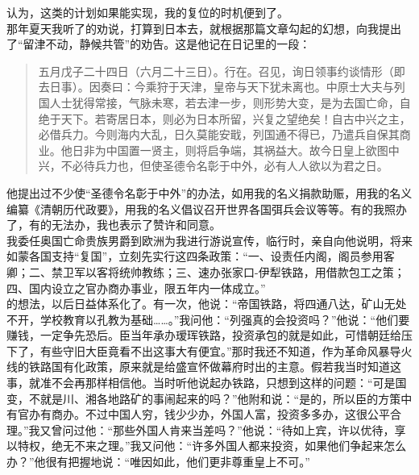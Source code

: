 认为，这类的计划如果能实现，我的复位的时机便到了。\\

那年夏天我听了的劝说，打算到日本去，就根据那篇文章勾起的幻想，向我提出了“留津不动，静候共管”的劝告。这是他记在日记里的一段：\\

\begin{quote}
	五月戊子二十四日（六月二十三日）。行在。召见，询日领事约谈情形（即去日事）。因奏曰：今乘狩于天津，皇帝与天下犹未离也。中原士大夫与列国人士犹得常接，气脉未寒，若去津一步，则形势大变，是为去国亡命，自绝于天下。若寄居日本，则必为日本所留，兴复之望绝矣！自古中兴之主，必借兵力。今则海内大乱，日久莫能安戢，列国通不得已，乃遣兵自保其商业。他日非为中国置一贤主，则将启争端，其祸益大。故今日皇上欲图中兴，不必待兵力也，但使圣德令名彰于中外，必有人人欲以为君之日。\\
\end{quote}

他提出过不少使“圣德令名彰于中外”的办法，如用我的名义捐款助赈，用我的名义编纂《清朝历代政要》，用我的名义倡议召开世界各国弭兵会议等等。有的我照办了，有的无法办，我也表示了赞许和同意。\\

我委任奥国亡命贵族男爵到欧洲为我进行游说宣传，临行时，亲自向他说明，将来如蒙各国支持“复国”，立刻先实行这四条政策：“一、设责任内阁，阁员参用客卿；二、禁卫军以客将统帅教练；三、速办张家口-伊犁铁路，用借款包工之策；四、国内设立之官办商办事业，限五年内一体成立。”\\

的想法，以后日益体系化了。有一次，他说：“帝国铁路，将四通八达，矿山无处不开，学校教育以孔教为基础……。”我问他：“列强真的会投资吗？”他说：“他们要赚钱，一定争先恐后。臣当年承办瑷珲铁路，投资承包的就是如此，可惜朝廷给压下了，有些守旧大臣竟看不出这事大有便宜。”那时我还不知道，作为革命风暴导火线的铁路国有化政策，原来就是给盛宣怀做幕府时出的主意。假若我当时知道这事，就准不会再那样相信他。当时听他说起办铁路，只想到这样的问题：“可是国变，不就是川、湘各地路矿的事闹起来的吗？”他附和说：“是的，所以臣的方策中有官办有商办。不过中国人穷，钱少少办，外国人富，投资多多办，这很公平合理。”我又曾问过他：“那些外国人肯来当差吗？”他说：“待如上宾，许以优待，享以特权，绝无不来之理。”我又问他：“许多外国人都来投资，如果他们争起来怎么办？”他很有把握地说：“唯因如此，他们更非尊重皇上不可。”\\


